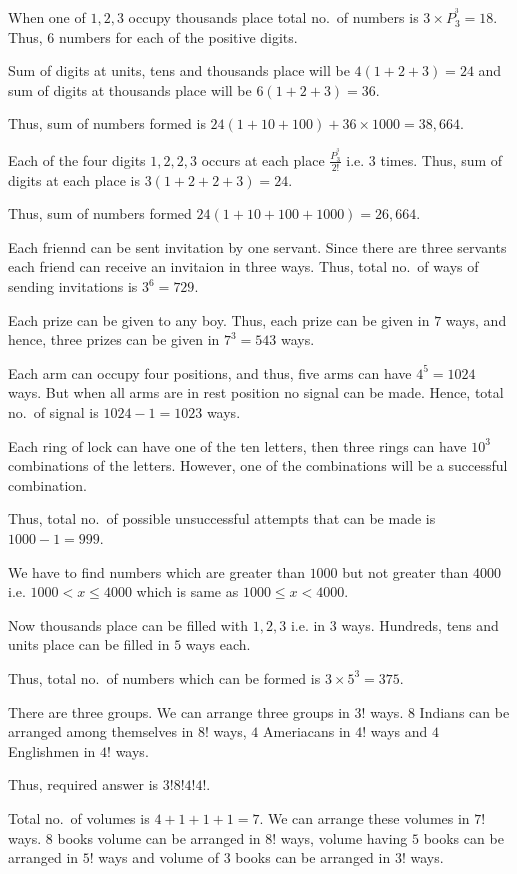   When one of $1, 2, 3$ occupy thousand\symbol[rightquote]s place total no.\ of numbers is $3\times P_3^^3 = 18$. Thus, $6$
  numbers for each of the positive digits.

  Sum of digits at units, tens and thousands place will be $4(1 + 2 + 3) = 24$ and sum of digits at
  thousands place will be $6(1 + 2 + 3) = 36$.

  Thus, sum of numbers formed is $24(1 + 10 + 100) + 36\times 1000 = 38,664$.
\item Each of the four digits $1, 2, 2, 3$ occurs at each place $\frac{P_3^^3}{2!}$ i.e. $3$ times. Thus,
  sum of digits at each place is $3(1 + 2 + 2 + 3) = 24$.

  Thus, sum of numbers formed $24(1 + 10 + 100 + 1000) = 26,664$.
\item Each friennd can be sent invitation by one servant. Since there are three servants each friend can
  receive an invitaion in three ways. Thus, total no.\ of ways of sending invitations is $3^6 = 729$.
\item Each prize can be given to any boy. Thus, each prize can be given in $7$ ways, and hence, three
  prizes can be given in $7^3 = 543$ ways.
\item Each arm can occupy four positions, and thus, five arms can have $4^5 = 1024$ ways. But when all arms
  are in rest position no signal can be made. Hence, total no.\ of signal is $1024 -1 = 1023$ ways.
\item Each ring of lock can have one of the ten letters, then three rings can have $10^3$ combinations of
  the letters. However, one of the combinations will be a successful combination.

  Thus, total no.\ of possible unsuccessful attempts that can be made is $1000 - 1 = 999$.
\item We have to find numbers which are greater than $1000$ but not greater than $4000$ i.e. $1000< x\leq
  4000$ which is same as $1000\leq x < 4000$.

  Now thousands place can be filled with $1, 2, 3$ i.e. in $3$ ways. Hundreds, tens and units place can be
  filled in $5$ ways each.

  Thus, total no.\ of numbers which can be formed is $3\times 5^3 = 375$.
\item There are three groups. We can arrange three groups in $3!$ ways. $8$ Indians can be arranged among
  themselves in $8!$ ways, $4$ Ameriacans in $4!$ ways and $4$ Englishmen in $4!$ ways.

  Thus, required answer is $3!8!4!4!$.
\item Total no.\ of volumes is $4 + 1 + 1 + 1 = 7$. We can arrange these volumes in $7!$ ways. $8$ books
  volume can be arranged in $8!$ ways, volume having $5$ books can be arranged in $5!$ ways and volume of
  $3$ books can be arranged in $3!$ ways.

